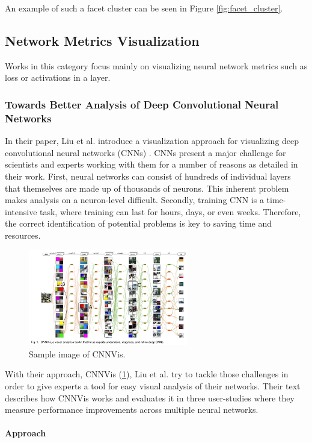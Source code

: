 \documentclass{acmsiggraph}               %
\newcommand{\paragraphbr}[1]{\paragraph{#1}\mbox{}\\}
\begin{document}
An example of such a facet cluster can be seen in Figure \ref{fig:facet_cluster}.


\subsection{Network Metrics Visualization}
Works in this category focus mainly on visualizing neural network metrics such as loss or activations in a layer.
\subsubsection{Towards Better Analysis of Deep Convolutional Neural Networks}
In their paper, Liu et al. introduce a  visualization approach for visualizing deep convolutional neural networks (CNNs) \cite{Liu2016}. CNNs present a major challenge for scientists and experts working with them for a number of reasons as detailed in their work. First, neural networks can consist of hundreds of individual layers that themselves are made up of thousands of neurons. This inherent problem makes analysis on a neuron-level difficult. Secondly, training CNN is a time-intensive task, where training can last for hours, days, or even weeks. Therefore, the correct identification of potential problems is key to saving time and resources.\\

\begin{figure}
  \centering
  \includegraphics[width=2.75in]{cnnvis}
  \caption{Sample image of CNNVis. \protect\cite{Liu2016}}
  \label{fig:cnnvis}
\end{figure}

With their approach, CNNVis (\ref{fig:cnnvis}), Liu et al. try to tackle those challenges in order to give experts a tool for easy visual analysis of their networks. Their text describes how CNNVis works and evaluates it in three user-studies where they measure performance improvements across multiple neural networks.\\

\paragraphbr{Approach}
\end{document}
